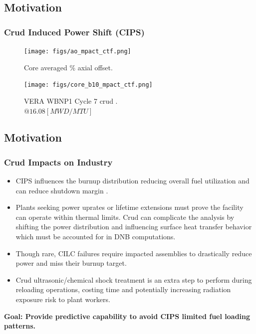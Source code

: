 \documentclass[t, pdftex]{beamer}
\begin{document}
\subsection*{Motivation}
\begin{frame}
    \frametitle{Crud Induced Power Shift (CIPS)}
    \vspace{-22pt}
    \begin{figure}
        \centering
        \begin{minipage}{.5\textwidth}
            \centering
            \texttt{[image: figs/ao\_mpact\_ctf.png]}
            \caption{Core averaged \% axial offset.}
        \end{minipage}%
        \begin{minipage}{.5\textwidth}
            \centering
            \texttt{[image: figs/core\_b10\_mpact\_ctf.png]}
            \caption{VERA WBNP1 Cycle 7 crud . \\ $@ 16.08 [MWD/MTU]$}
        \end{minipage}
    \end{figure}
 \cite{collins2015}
\end{frame}

\subsection*{Motivation}
\begin{frame}
\frametitle{Crud Impacts on Industry}
\vspace{-24pt}
\begin{itemize}
    \item CIPS influences the burnup distribution reducing overall fuel utilization and can reduce shutdown margin  \cite{lange2017}.
    \item Plants seeking power uprates or lifetime extensions must prove the facility can operate within thermal limits.  Crud can complicate the analysis by shifting the power distribution and influencing surface heat transfer behavior which must be accounted for in DNB computations.
    \item Though rare, CILC failures require impacted assemblies to drastically reduce power and miss their burnup target.
    \item Crud ultrasonic/chemical shock treatment is an extra step to perform during reloading operations, costing time and potentially increasing radiation exposure risk to plant workers.
\end{itemize}
\textbf{Goal: Provide predictive capability to avoid CIPS limited fuel loading patterns.}
\end{frame}
\end{document}
